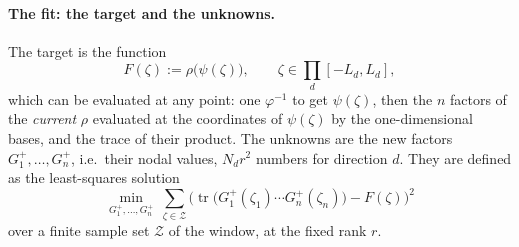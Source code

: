 \documentclass[11pt,a4paper]{article}
\newcommand{\tr}{\operatorname{tr}}
\theoremstyle{plain}
\theoremstyle{definition}
\theoremstyle{remark}
\begin{document}
\paragraph{The fit: the target and the unknowns.}
The target is the function
\begin{equation}
  F(\zeta) := \rho\big(\psi(\zeta)\big), \qquad \zeta\in\prod_d[-L_d,L_d],
  \label{eq:trace_target}
\end{equation}
which can be evaluated at any point: one $\varphi^{-1}$ to get $\psi(\zeta)$, then the $n$ factors of the \emph{current} $\rho$ evaluated at the coordinates of $\psi(\zeta)$ by the one-dimensional bases, and the trace of their product. The unknowns are the new factors $G_1^+,\dots,G_n^+$, i.e.\ their nodal values, $N_dr^2$ numbers for direction $d$. They are defined as the least-squares solution
\begin{equation}
  \min_{G_1^+,\dots,G_n^+}\ \sum_{\zeta\in\mathcal Z}\Big(\tr\big(G_1^+(\zeta_1)\cdots G_n^+(\zeta_n)\big) - F(\zeta)\Big)^2
  \label{eq:trace_fit}
\end{equation}
over a finite sample set $\mathcal Z$ of the window, at the fixed rank $r$.
\end{document}
